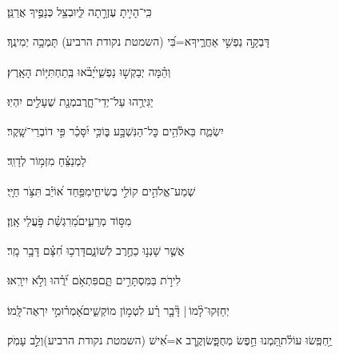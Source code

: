\documentclass[12pt]{article}
\newcommand{\loc}[1]{\textsuperscript{\locf{#1}}}
\begin{document}
{\loc{ ח}~}‏כִּֽי־הָיִ֣יתָ עֶזְרָ֣תָה לִּ֑י{\hfill}וּבְצֵ֖ל כְּנָפֶ֣יךָ אֲרַנֵּֽן׃\par

{\loc{ ט}~}‏דָּבְקָ֣ה נַפְשִׁ֣י אַחֲרֶ֑יךָ{\hfill}א=בִּ֝י (השמטת נקודת הרביע) תָּמְכָ֥ה יְמִינֶֽךָ׃\par

{\loc{ י}~}‏וְהֵ֗מָּה  יְבַקְשׁ֣וּ נַפְשִׁ֑י{\hfill}יָ֝בֹ֗אוּ בְּֽתַחְתִּיּ֥וֹת הָאָֽרֶץ׃\par

{\loc{ יא}~}‏יַגִּירֻ֥הוּ עַל־יְדֵי־חָ֑רֶב{\hfill}מְנָ֖ת שֻׁעָלִ֣ים יִהְיֽוּ׃\par

{\loc{ יב}~}‏{\hfill}יִשְׂמַ֢ח בֵּאלֹ֫הִ֥ים\newline\hspace*{.5em} כׇּל־הַנִּשְׁבָּ֣ע בּ֑וֹ{\hfill}כִּ֥י יִ֝סָּכֵ֗ר פִּ֣י דוֹבְרֵי־שָֽׁקֶר׃\par\pend
\ledpb
\pstart[\subsection*{\textcolor{red}{פרק סד}}]\label{פרק סד}
{\loc{ א}~}‏לַמְנַצֵּ֗חַ מִזְמ֥וֹר לְדָוִֽד׃\par

{\loc{ ב}~}‏שְׁמַע־אֱלֹהִ֣ים קוֹלִ֣י בְשִׂיחִ֑י{\hfill}מִפַּ֥חַד א֝וֹיֵ֗ב תִּצֹּ֥ר חַיָּֽי׃\par

{\loc{ ג}~}‏ מִסּ֣וֹד מְרֵעִ֑ים{\hfill}מֵ֝רִגְשַׁ֗ת פֹּ֣עֲלֵי אָֽוֶן׃\par

{\loc{ ד}~}‏אֲשֶׁ֤ר שָׁנְנ֣וּ כַחֶ֣רֶב לְשׁוֹנָ֑ם{\hfill}דָּרְכ֥וּ חִ֝צָּ֗ם דָּבָ֥ר מָֽר׃\par

{\loc{ ה}~}‏לִירֹ֣ת בַּמִּסְתָּרִ֣ים תָּ֑ם{\hfill}פִּתְאֹ֥ם יֹ֝רֻ֗הוּ וְלֹ֣א יִירָֽאוּ׃\par

{\loc{ ו}~}‏יְחַזְּקוּ־לָ֨מוֹ |  דָּ֘בָ֤ר רָ֗ע{\hfill} לִטְמ֣וֹן מוֹקְשִׁ֑ים\newline\hspace*{.5em}אָ֝מְר֗וּ{\hfill}מִ֣י יִרְאֶה־לָּֽמוֹ׃\par

{\loc{ ז}~}‏יַ֥חְפְּֽשׂוּ עוֹלֹ֗ת{\hfill}תַּ֭מְנוּ חֵ֣פֶשׂ מְחֻפָּ֑שׂ\newline\hspace*{.5em}וְקֶ֥רֶב א=אִ֝ישׁ (השמטת נקודת הרביע){\hfill}וְלֵ֣ב עָמֹֽק׃\par
\end{document}
